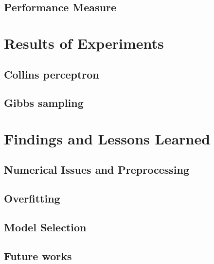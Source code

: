 \documentclass[twoside,12pt]{article}
\begin{document}
\subsection{Performance Measure}
\section{Results of Experiments}
\subsection{Collins perceptron}
\subsection{Gibbs sampling}

\section{Findings and Lessons Learned}
\subsection{Numerical Issues and Preprocessing}
\subsection{Overfitting}
\subsection{Model Selection}
\subsection{Future works}
\end{document}
